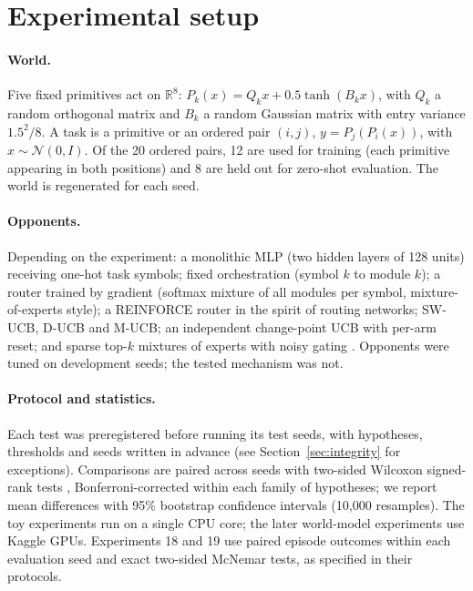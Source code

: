 \documentclass[11pt,a4paper]{article}
\begin{document}
\section{Experimental setup}

\paragraph{World.} Five fixed primitives act on $\mathbb{R}^8$: $P_k(x) = Q_k x + 0.5 \tanh(B_k x)$, with $Q_k$ a random orthogonal matrix and $B_k$ a random Gaussian matrix with entry variance $1.5^2/8$. A task is a primitive or an ordered pair $(i,j)$, $y = P_j(P_i(x))$, with $x \sim \mathcal{N}(0, I)$. Of the 20 ordered pairs, 12 are used for training (each primitive appearing in both positions) and 8 are held out for zero-shot evaluation. The world is regenerated for each seed.

\paragraph{Opponents.} Depending on the experiment: a monolithic MLP (two hidden layers of 128 units) receiving one-hot task symbols; fixed orchestration (symbol $k$ to module $k$); a router trained by gradient (softmax mixture of all modules per symbol, mixture-of-experts style); a REINFORCE router \citep{williams1992reinforce} in the spirit of routing networks; SW-UCB, D-UCB and M-UCB; an independent change-point UCB with per-arm reset; and sparse top-$k$ mixtures of experts with noisy gating \citep{shazeer2017moe}. Opponents were tuned on development seeds; the tested mechanism was not.

\paragraph{Protocol and statistics.} Each test was preregistered before running its test seeds, with hypotheses, thresholds and seeds written in advance (see Section~\ref{sec:integrity} for exceptions). Comparisons are paired across seeds with two-sided Wilcoxon signed-rank tests \citep{wilcoxon1945}, Bonferroni-corrected within each family of hypotheses; we report mean differences with 95\% bootstrap confidence intervals (10{,}000 resamples). The toy experiments run on a single CPU core; the later world-model experiments use Kaggle GPUs. Experiments 18 and 19 use paired episode outcomes within each evaluation seed and exact two-sided McNemar tests, as specified in their protocols.
\end{document}
